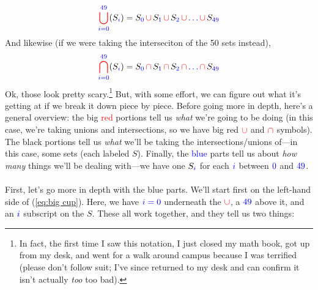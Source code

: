 \documentclass[10pt]{article}
\theoremstyle{definition}
\let\oldref\ref
\renewcommand{\ref}[1]{(\oldref{#1})}
\begin{document}
\begin{equation}\label{eq:big cup}
{\color{red}\bigcup^{{\color{blue}49}}_{\color{blue}i={0}}}(S_{\color{blue}i}) = S_{\color{blue}0}\,{\color{red}\cup}\,S_{\color{blue}1}\,{\color{red}\cup} \,S_{\color{blue}2} \,{\color{red}\cup} \,{\color{blue}\ldots} \,{\color{red}\cup}\, S_{\color{blue}49}
\end{equation}
And likewise (if we were taking the interseciton of the 50 sets instead),
\begin{equation}\label{eq:big cap}
{\color{red}\bigcap^{{\color{blue}49}}_{\color{blue}i=0}}(S_{\color{blue}i}) = S_{\color{blue}0}\,{\color{red}\cap}\,S_{\color{blue}1}\,{\color{red}\cap} \,S_{\color{blue}2} \,{\color{red}\cap} \,{\color{blue}\ldots} \,{\color{red}\cap}\, S_{\color{blue}49}
\end{equation}
Ok, those look pretty scary.\footnote{In fact, the first time I saw this notation, I just closed my math book, got up from my desk, and went for a walk around campus because I was terrified (please don't follow suit; I've since returned to my desk and can confirm it isn't actually \emph{too} too bad).}  But, with some effort, we can figure out what it's getting at if we break it down piece by piece.  Before going more in depth, here's a general overview: the big \textcolor{red}{red} portions tell us \emph{what} we're going to be doing (in this case, we're taking unions and intersections, so we have big red $\color{red}\cup$ and $\color{red}\cap$ symbols).  The black portions tell us \emph{what} we'll be taking the intersections/unions of---in this case, some sets (each labeled $S$).  Finally, the \textcolor{blue}{blue} parts tell us about \emph{how many} things we'll be dealing with---we have one $S_{\color{blue}i}$ for each $\color{blue}i$ between $\color{blue}0$ and $\color{blue}49$.  \\~\\
First, let's go more in depth with the blue parts.  We'll start first on the left-hand side of \ref{eq:big cup}.  Here, we have $\color{blue}i=0$ underneath the $\color{red}\cup$, a $\color{blue}49$ above it, and an $\color{blue}i$ subscript on the $S$.  These all work together, and they tell us two things: 
\end{document}
